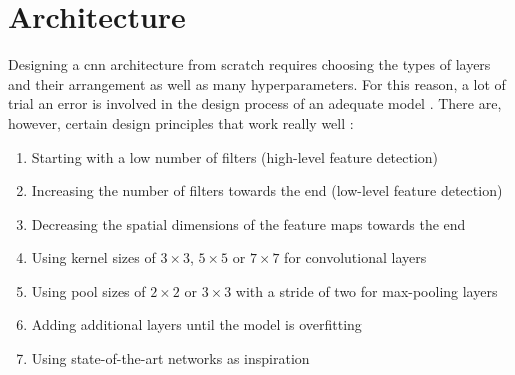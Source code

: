 \section{Architecture}
\label{sec:training_of_the_cnn:architecture}

Designing a \acrlong{cnn} architecture from scratch requires choosing the types of layers and their arrangement as well as many hyperparameters.
For this reason, a lot of trial an error is involved in the design process of an adequate model \cite{}. %
There are, however, certain design principles that work really well \cite{}: %

\begin{enumerate}
  \item Starting with a low number of filters (high-level feature detection)
  \item Increasing the number of filters towards the end (low-level feature detection)
  \item Decreasing the spatial dimensions of the feature maps towards the end
  \item Using kernel sizes of $3\times 3$, $5\times 5$ or $7\times 7$ for convolutional layers
  \item Using pool sizes of $2\times 2$ or $3\times 3$ with a stride of two for max-pooling layers
  \item Adding additional layers until the model is overfitting
  \item Using state-of-the-art networks as inspiration
\end{enumerate}


